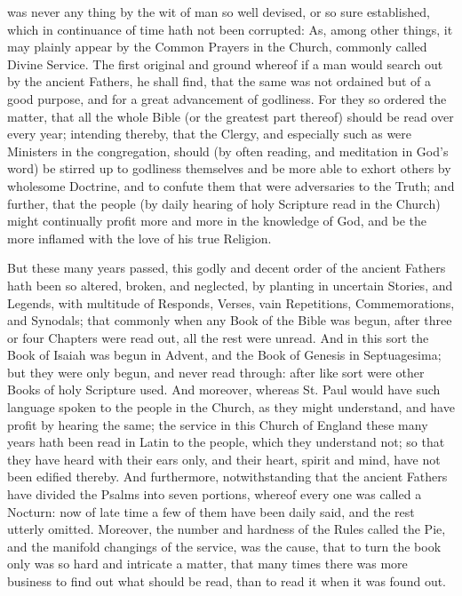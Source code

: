 
 was never any thing by the wit of man so well devised, or so sure established, which in continuance of time hath not been corrupted: As, among other things, it may plainly appear by the Common Prayers in the Church, commonly called Divine Service. The first original and ground whereof if a man would search out by the ancient Fathers, he shall find, that the same was not ordained but of a good purpose, and for a great advancement of godliness. For they so ordered the matter, that all the whole Bible (or the greatest part thereof) should be read over every year; intending thereby, that the Clergy, and especially such as were Ministers in the congregation, should (by often reading, and meditation in God's word) be stirred up to godliness themselves and be more able to exhort others by wholesome Doctrine, and to confute them that were adversaries to the Truth; and further, that the people (by daily hearing of holy Scripture read in the Church) might continually profit more and more in the knowledge of God, and be the more inflamed with the love of his true Religion.

But these many years passed, this godly and decent order of the ancient Fathers hath been so altered, broken, and neglected, by planting in uncertain Stories, and Legends, with multitude of Responds, Verses, vain Repetitions, Commemorations, and Synodals; that commonly when any Book of the Bible was begun, after three or four Chapters were read out, all the rest were unread. And in this sort the Book of Isaiah was begun in Advent, and the Book of Genesis in Septuagesima; but they were only begun, and never read through: after like sort were other Books of holy Scripture used. And moreover, whereas St. Paul would have such language spoken to the people in the Church, as they might understand, and have profit by hearing the same; the service in this Church of England these many years hath been read in Latin to the people, which they understand not; so that they have heard with their ears only, and their heart, spirit and mind, have not been edified thereby. And furthermore, notwithstanding that the ancient Fathers have divided the Psalms into seven portions, whereof every one was called a Nocturn: now of late time a few of them have been daily said, and the rest utterly omitted. Moreover, the number and hardness of the Rules called the Pie, and the manifold changings of the service, was the cause, that to turn the book only was so hard and intricate a matter, that many times there was more business to find out what should be read, than to read it when it was found out.

